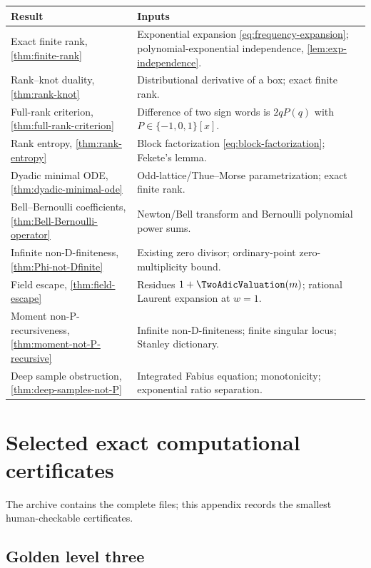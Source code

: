 \documentclass[11pt]{article}
\numberwithin{equation}{section}
\theoremstyle{definition}
\theoremstyle{remark}
\begin{document}
\begin{center}
\begin{tabularx}{\textwidth}{>{\raggedright\arraybackslash}p{}X}
\toprule
Result & Inputs\\
\midrule
Exact finite rank, \cref{thm:finite-rank}
 & Exponential expansion \eqref{eq:frequency-expansion};
   polynomial-exponential independence, \cref{lem:exp-independence}.\\
Rank--knot duality, \cref{thm:rank-knot}
 & Distributional derivative of a box; exact finite rank.\\
Full-rank criterion, \cref{thm:full-rank-criterion}
 & Difference of two sign words is $2qP(q)$ with
   $P\in\{-1,0,1\}[x]$.\\
Rank entropy, \cref{thm:rank-entropy}
 & Block factorization \eqref{eq:block-factorization}; Fekete's lemma.\\
Dyadic minimal ODE, \cref{thm:dyadic-minimal-ode}
 & Odd-lattice/Thue--Morse parametrization; exact finite rank.\\
Bell--Bernoulli coefficients, \cref{thm:Bell-Bernoulli-operator}
 & Newton/Bell transform and Bernoulli polynomial power sums.\\
Infinite non-D-finiteness, \cref{thm:Phi-not-Dfinite}
 & Existing zero divisor; ordinary-point zero-multiplicity bound.\\
Field escape, \cref{thm:field-escape}
 & Residues $1+\TwoAdicValuation(m)$; rational Laurent expansion at $w=1$.\\
Moment non-P-recursiveness, \cref{thm:moment-not-P-recursive}
 & Infinite non-D-finiteness; finite singular locus; Stanley dictionary.\\
Deep sample obstruction, \cref{thm:deep-samples-not-P}
 & Integrated Fabius equation; monotonicity; exponential ratio separation.\\
\bottomrule
\end{tabularx}
\end{center}

\section{Selected exact computational certificates}
\label{app:certificates}

The archive contains the complete files; this appendix records the smallest
human-checkable certificates.

\subsection{Golden level three}
\end{document}
